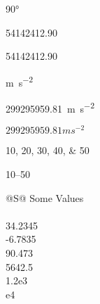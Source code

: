 \documentclass[12pt,ngerman]{scrartcl}
\begin{document}
\ang{90}

\num{54142412,90}

\num{54142412.90}

\unit{\meter\per\square\second}

\qty{299295959.81}{\meter\per\square\second}

$299295959.81 ms^{-2}$ %

\numlist{10;20;30;40;50}

\numrange{10}{50}

\begin{table}[h]
\begin{center}
\caption{Standard behaviour of the \texttt{S} column type.%
\label{tab:S:standard}}
\begin{tabular}{@{}S@{}}
\toprule
{Some Values} \\
 \\
34.2345 \\
-6.7835 \\
90.473 \\
5642.5 \\
1.2e3 \\
e4 \\
\bottomrule
\end{tabular}
\end{center}
\end{table}
\end{document}
